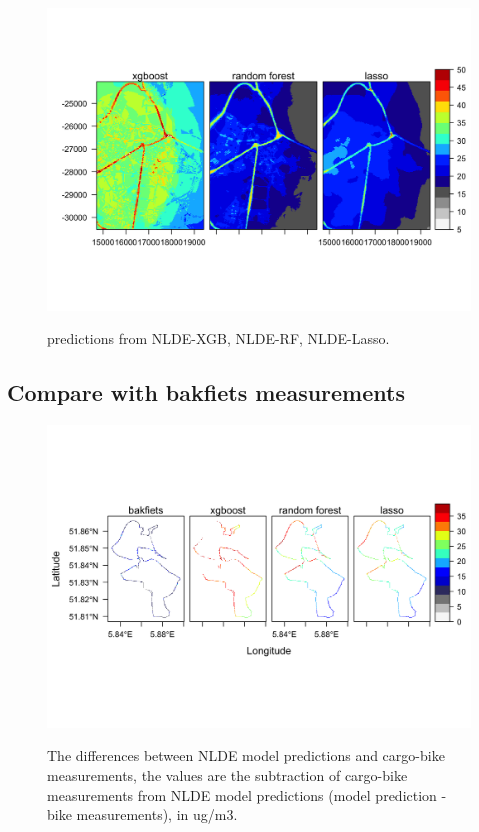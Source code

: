 \documentclass{article}
\begin{document}
\begin{figure}[h!]
    \includegraphics[width=\linewidth]{NLDE.png}
    \label{nldepred}
    \caption {predictions from NLDE-XGB, NLDE-RF, NLDE-Lasso.}
\end{figure}

\subsection{Compare with bakfiets measurements}



\begin{figure}[h!]
    \includegraphics [scale = 0.3 ]{NLDE_vs_bak.png}
    \label{nldevsbak}
    \caption { The differences between NLDE model predictions and cargo-bike measurements, the values are the subtraction of cargo-bike measurements from NLDE model predictions (model prediction - bike measurements), in ug/m3.}
\end{figure}
\end{document}
